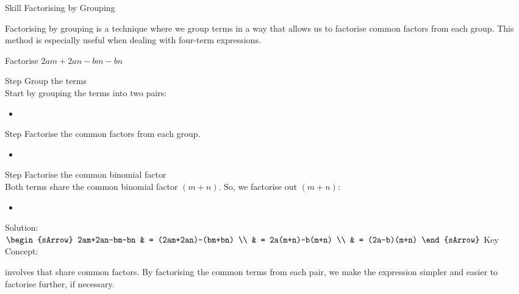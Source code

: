 \begin{boxSkill}{Skill   \thenskill \quad Factorising by Grouping}
   
Factorising by grouping is a technique where we group terms in a way that allows us to factorise
 common factors from each group. This method is especially useful when dealing with
 four-term expressions.

\tcbline

Factorise $2am+2an-bm-bn$\\ 
    \begin{mtask}
       \task[] Step \circled{\ncnt} Group the terms\\
               \-\hspace{2cm} Start by grouping the terms into two pairs: 
			   \begin{itemize}[leftmargin=2.3cm] \item[]   \end{itemize}

       \task[]  Step \circled{\ncnt} Factorise the common factors from each group.
	            \begin{itemize}[leftmargin=2.3cm] \item[]   \end{itemize} 

       \task[]  Step \circled{\ncnt} Factorise the common binomial factor\\
               \-\hspace{2cm} Both terms share the common binomial factor $(m+n)$. So, we factorise out $(m+n)$:
               \begin{itemize}[leftmargin=2.3cm] \item[]  \end{itemize}
\end{mtask}

\tcbline
Solution:\\
      \-\hspace{2cm}$\begin{sArrow}
			             2am+2an-bm-bn 
                       & = (2am+2an)-(bm+bn)   \\
                       & = 2a(m+n)-b(m+n)      \\
					   & = (2a-b)(m+n)
	                \end{sArrow}$
\tcbline  
Key Concept:
\begin{mtask}
    \task[\HandRight]  involves  that share common factors.
    \task[\HandRight] By factorising the common terms from each pair, we make the expression simpler and easier to factorise further, if necessary.
\end{mtask}
\end{boxSkill} 




